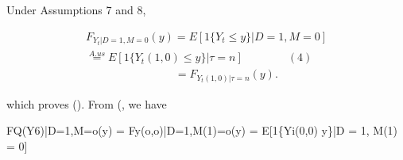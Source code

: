 \documentclass{article}
\begin{document}
Under Assumptions 7 and 8,


\begin{equation}
\begin{array} { c } { F _ { Y _ { t } | D = 1, M = 0 } ( y ) = E [ 1 \{ Y _ { t } \leq y \} | D = 1, M = 0 ] } \\ { \overset { A. u s } { = } E [ 1 \{ Y _ { t } ( 1, 0 ) \leq y \} | \tau = n ] \qquad \qquad ( 4 ) } \\ { \qquad \qquad \qquad \qquad = F _ { Y _ { t } ( 1, 0 ) | \tau = n } ( y ). } \end{array}
\end{equation}


which proves (). From (, we have


FQ(Y6)|D=1,M=o(y) = Fy(o,o)|D=1,M(1)=o(y) = E[1\{Yi(0,0)  y\}|D = 1, M(1) = 0]
\end{document}
